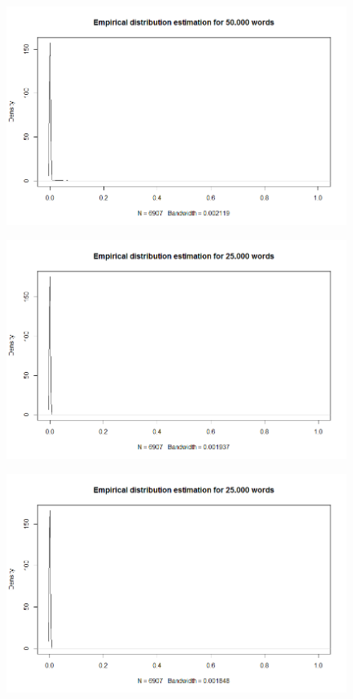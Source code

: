 \documentclass[10pt, a4paper, oneside]{article} %
\begin{document}
\begin{figure}[! ht]
\centering
\includegraphics[scale=0.5]{./Figures/50.png}
\label{50}
\end{figure}

\begin{figure}[! ht]
\centering
\includegraphics[scale=0.5]{./Figures/25.png}
\label{25}
\end{figure}

\begin{figure}[! ht]
\centering
\includegraphics[scale=0.5]{./Figures/10.png}
\label{10}
\end{figure}
\end{document}
